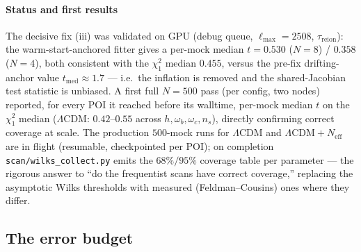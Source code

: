 \documentclass[11pt]{article}
\newcommand{\file}[1]{\texttt{\small #1}}
\newcommand{\Neff}{N_{\mathrm{eff}}}
\newcommand{\chisq}{\chi^2}
\newcommand{\Lmax}{\ell_{\max}}
\begin{document}
\paragraph{Status and first results}
The decisive fix (iii) was validated on GPU (debug queue, $\Lmax=2508$,
$\tau_{\mathrm{reion}}$): the warm-start-anchored fitter gives a per-mock
median $t=0.530$ ($N{=}8$) / $0.358$ ($N{=}4$), both consistent with the
$\chisq_1$ median $0.455$, versus the pre-fix drifting-anchor value
$t_{\mathrm{med}}\!\approx\!1.7$ --- i.e.\ the inflation is removed and the
shared-Jacobian test statistic is unbiased. A first full $N{=}500$ pass (per
config, two nodes) reported, for every POI it reached before its walltime,
per-mock median $t$ on the $\chisq_1$ median ($\Lambda$CDM: $0.42$--$0.55$
across $h,\omega_b,\omega_c,n_s$), directly confirming correct coverage at
scale. The production $500$-mock runs for $\Lambda$CDM and
$\Lambda\mathrm{CDM}+\Neff$ are in flight (resumable, checkpointed per POI);
on completion \file{scan/wilks\_collect.py} emits the $68\%/95\%$ coverage
table per parameter --- the rigorous answer to ``do the frequentist scans
have correct coverage,'' replacing the asymptotic Wilks thresholds with
measured (Feldman--Cousins) ones where they differ.

\subsection{The error budget}
\label{sec:errbudget}
\end{document}
